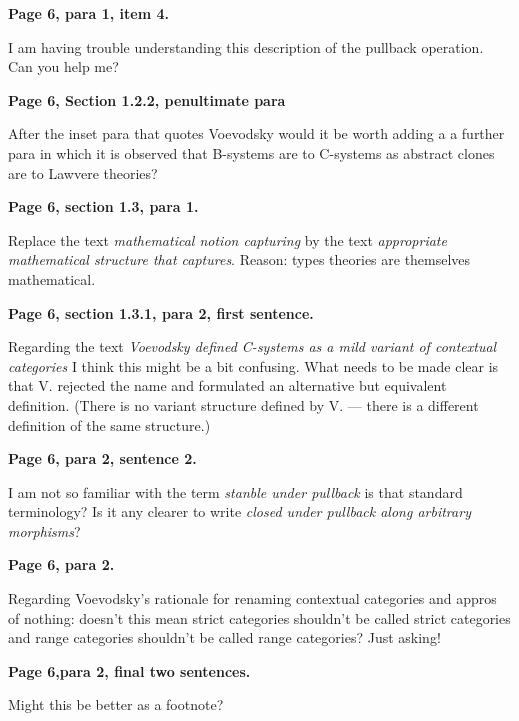 \documentclass[10pt,a4paper]{scrartcl}
\newenvironment{comment}[1]
{\begin{framed}
\textbf{#1}
}
{
\end{framed}
}
\begin{document}
\begin{comment}{Page 6, para 1, item 4.}
I am having trouble understanding this description of the pullback operation. Can you help me?
\end{comment} 

\begin{comment}{Page 6, Section 1.2.2, penultimate para}

After the inset para that quotes Voevodsky would it be worth adding a a further para in which it is observed that B-systems are to C-systems as abstract clones are to Lawvere theories?
\end{comment} 

\begin{comment}{Page 6, section 1.3, para 1.}
Replace the text \textit{mathematical notion capturing}
by the text
\textit{appropriate mathematical structure that captures}.
Reason: types theories are themselves mathematical.
\end{comment} 


\begin{comment}{Page 6, section 1.3.1, para 2, first sentence.}
Regarding the text \textit{Voevodsky defined C-systems as a mild variant of contextual categories} I think this might be a bit confusing. 
What needs to be made clear is that V. rejected the name and formulated an alternative but equivalent definition.
(There is no variant structure defined by V. --- there is a different definition of the same structure.)
\end{comment} 

\begin{comment}{Page 6, para 2, sentence 2.}
I am not so familiar with the term \textit{stanble under pullback}
is that standard terminology? Is it any clearer to write
\textit{closed under pullback along arbitrary morphisms}?
\end{comment}

\begin{comment}{Page 6, para 2.}
Regarding Voevodsky's rationale for renaming contextual categories and appros of nothing: doesn't this mean strict categories shouldn't be called strict categories and range categories shouldn't be called range categories? Just asking!
\end{comment}

\begin{comment}{Page 6,para 2, final two sentences.}
Might this be better as a footnote?
\end{comment}  
\end{document}
